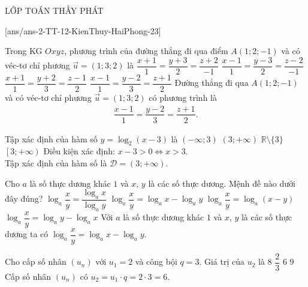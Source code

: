 \begin{name}
	{\tenchude}{\tendethi}{LỚP TOÁN THẦY PHÁT}{\thoigian}
\end{name}
\setcounter{ex}{0}\setcounter{bt}{0}
[ans/ans-2-TT-12-KienThuy-HaiPhong-23]

\begin{ex}%
	Trong KG $Oxyz$, phương trình của đường thẳng đi qua điểm $A(1;2;-1)$ và có véc-tơ chỉ phương $\overrightarrow{u}=(1;3;2)$ là
	\choice
	{$\dfrac{x+1}{1}=\dfrac{y+3}{2}=\dfrac{z+2}{-1}$}
	{$\dfrac{x-1}{1}=\dfrac{y-3}{2}=\dfrac{z-2}{-1}$}
	{$\dfrac{x+1}{1}=\dfrac{y+2}{3}=\dfrac{z-1}{2}$}
	{\True $\dfrac{x-1}{1}=\dfrac{y-2}{3}=\dfrac{z+1}{2}$}
	\loigiai
	{
		Đường thẳng đi qua $A(1;2;-1)$ và có véc-tơ chỉ phương $\overrightarrow{u}=(1;3;2)$ có phương trình là
		\begin{align*}
			\dfrac{x-1}{1}=\dfrac{y-2}{3}=\dfrac{z+1}{2}.
		\end{align*}	
	}
\end{ex}

\begin{ex}%
	Tập xác định của hàm số $y=\log_2 (x-3)$ là
	\choice
	{$(-\infty;3)$}
	{\True $(3;+\infty)$}
	{$\mathbb{R}\setminus \{3\}$}
	{$\left[3;+\infty\right)$}
	\loigiai
	{
		Điều kiện xác định: $x-3>0\Leftrightarrow x>3$.\\
		Tập xác định của hàm số là $\mathscr{D}=(3;+\infty)$.
	}
\end{ex}

\begin{ex}%
	Cho $a$ là số thực dương khác $1$ và $x$, $y$ là các số thực dương. Mệnh đề nào dưới đây đúng?
	\choice
	{$\log_a \dfrac{x}{y}=\dfrac{\log_a x}{\log_a y}$}
	{\True $\log_a \dfrac{x}{y}=\log_a x-\log_a y$}
	{$\log_a \dfrac{x}{y}=\log_a (x-y)$}
	{$\log_a \dfrac{x}{y}=\log_a y-\log_a x$}
	\loigiai
	{
		Với $a$ là số thực dương khác $1$ và $x$, $y$ là các số thực dương ta có $\log_a \dfrac{x}{y}=\log_a x-\log_a y$.
	}
\end{ex}

\begin{ex}%
	Cho cấp số nhân $(u_n)$ với $u_1=2$ và công bội $q=3$. Giá trị của $u_2$ là
	\choice
	{$8$}
	{$\dfrac{2}{3}$}
	{\True $6$}
	{$9$}
	\loigiai
	{
		Cấp số nhân $(u_n)$ có $u_2=u_1\cdot q=2\cdot 3=6$.	
	}
\end{ex}

